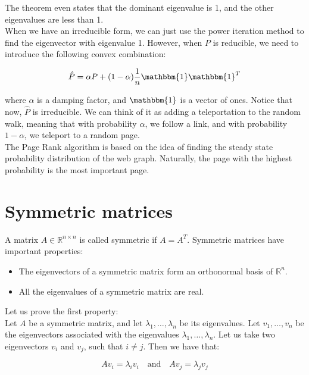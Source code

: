 The theorem even states that the dominant eigenvalue is 1, and the other eigenvalues are less than 1.\\

When we have an irreducible form, we can just use the power iteration method to find the eigenvector with
eigenvalue 1. However, when $P$ is reducible, we need to introduce the following convex combination:

\begin{equation}
    \hat{P} = \alpha P + (1 - \alpha) \frac{1}{n} \mathbbm{1} \mathbbm{1}^T
\end{equation}

where $\alpha$ is a damping factor, and $\mathbbm{1}$ is a vector of ones. Notice that now, $\hat{P}$ is
irreducible. We can think of it as adding a teleportation to the random walk, meaning that
with probability $\alpha$, we follow a link, and with probability $1 - \alpha$, we teleport to a random page.\\

The Page Rank algorithm is based on the idea of finding the steady state probability distribution of the web graph.
Naturally, the page with the highest probability is the most important page.

\section{Symmetric matrices}

A matrix $A \in \mathbb{R}^{n \times n}$ is called symmetric if $A = A^T$. Symmetric matrices have important properties:

\begin{itemize}
    \item The eigenvectors of a symmetric matrix form an orthonormal basis of $\mathbb{R}^n$.
    \item All the eigenvalues of a symmetric matrix are real.
\end{itemize}

Let us prove the first property:\\

Let $A$ be a symmetric matrix, and let $\lambda_1, \ldots, \lambda_n$ be its eigenvalues. Let $v_1, \ldots, v_n$ be the eigenvectors
associated with the eigenvalues $\lambda_1, \ldots, \lambda_n$. Let us take two eigenvectors $v_i$ and $v_j$, such that $i \neq j$.
Then we have that:

\begin{equation}
    A v_i = \lambda_i v_i \quad \text{and} \quad A v_j = \lambda_j v_j
\end{equation}


